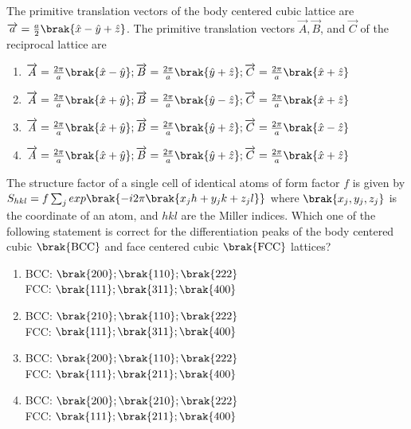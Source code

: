 \item{
The primitive translation vectors of the body centered cubic lattice are $\overrightarrow{a}=\frac{a}{2}\brak{\hat{x}-\hat{y}+\hat{z}}$. The primitive translation vectors $\overrightarrow{A},\overrightarrow{B}$, and $\overrightarrow{C}$ of the reciprocal lattice are
\begin{enumerate}
\item $\overrightarrow{A}=\frac{2\pi}{a}\brak{\hat{x}-\hat{y}};\overrightarrow{B}=\frac{2\pi}{a}\brak{\hat{y}+\hat{z}};\overrightarrow{C}=\frac{2\pi}{a}\brak{\hat{x}+\hat{z}}$
\item $\overrightarrow{A}=\frac{2\pi}{a}\brak{\hat{x}+\hat{y}};\overrightarrow{B}=\frac{2\pi}{a}\brak{\hat{y}-\hat{z}};\overrightarrow{C}=\frac{2\pi}{a}\brak{\hat{x}+\hat{z}}$
\item $\overrightarrow{A}=\frac{2\pi}{a}\brak{\hat{x}+\hat{y}};\overrightarrow{B}=\frac{2\pi}{a}\brak{\hat{y}+\hat{z}};\overrightarrow{C}=\frac{2\pi}{a}\brak{\hat{x}-\hat{z}}$
\item $\overrightarrow{A}=\frac{2\pi}{a}\brak{\hat{x}+\hat{y}};\overrightarrow{B}=\frac{2\pi}{a}\brak{\hat{y}+\hat{z}};\overrightarrow{C}=\frac{2\pi}{a}\brak{\hat{x}+\hat{z}}$
\end{enumerate}
\item{
The structure factor of a single cell of identical atoms of form factor $f$ is given by $S_{hkl}=f\sum_jexp\brak{-i2\pi\brak{x_jh+y_jk+z_jl}}$ where $\brak{x_j,y_j,z_j}$ is the coordinate of an atom, and $hkl$ are the Miller indices. Which one of the following statement is correct for the differentiation peaks of the body centered cubic $\brak{\text{BCC}}$ and face centered cubic $\brak{\text{FCC}}$ lattices?
\begin{multicols}{2}
\begin{enumerate}
\item BCC: $\brak{200};\brak{110};\brak{222}$\\FCC: $\brak{111};\brak{311};\brak{400}$
\item BCC: $\brak{210};\brak{110};\brak{222}$\\FCC: $\brak{111};\brak{311};\brak{400}$
\item BCC: $\brak{200};\brak{110};\brak{222}$\\FCC: $\brak{111};\brak{211};\brak{400}$
\item BCC: $\brak{200};\brak{210};\brak{222}$\\FCC: $\brak{111};\brak{211};\brak{400}$
\end{enumerate}
\end{multicols}
}}

